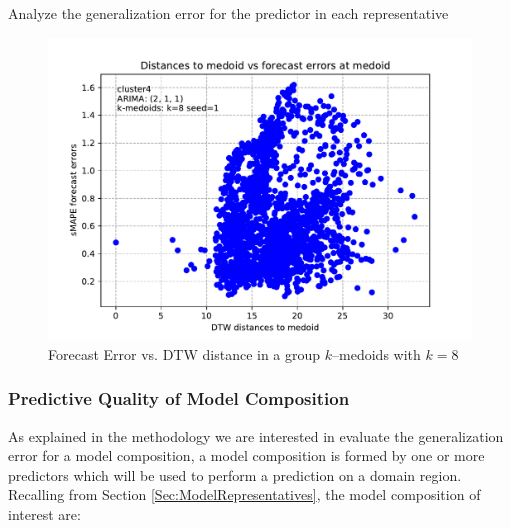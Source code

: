 
Analyze the generalization error for the predictor in each representative 

\begin{figure}[h]
	\centering
	\includegraphics[scale=0.5]{../Figures/auto_arima_distance_error_whole_brazil_1y_1ppd_k8_seed1_cluster4_pdq2-1-1_sMAPE}
	\caption{Forecast Error vs. DTW distance in a group $k$--medoids with $k=8$}
	\label{Fig:DTWvsForecastError}
\end{figure}

\subsubsection{Predictive Quality of Model Composition}
\label{Sec:ModelComposition}

As explained in the methodology we are interested in evaluate the generalization error for a model composition, a model composition is formed by one or more predictors which will be used to perform a prediction on a domain region. Recalling from Section \ref{Sec:ModelRepresentatives}, the model composition of interest are:

